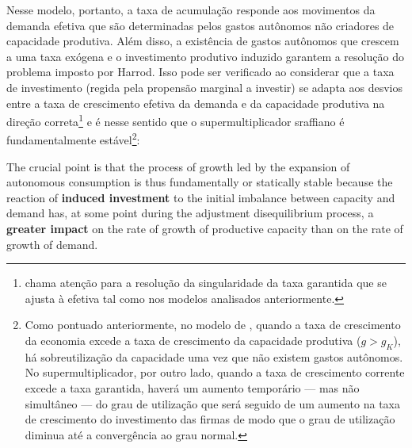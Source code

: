 Nesse modelo, portanto, a taxa de acumulação responde aos movimentos da demanda efetiva que são determinadas pelos gastos autônomos não criadores de capacidade produtiva. Além disso, a existência de gastos autônomos que crescem a uma taxa exógena e o investimento produtivo induzido garantem a resolução do problema imposto por Harrod. Isso pode ser verificado ao considerar que a taxa de investimento (regida pela propensão marginal a investir) se adapta aos desvios entre a taxa de crescimento efetiva da demanda e da capacidade produtiva na direção correta\footnote{\textcite{cesaratto_neo-kaleckian_2015} chama atenção para a resolução da singularidade da taxa garantida que se ajusta à efetiva tal como nos modelos analisados anteriormente.} e é nesse sentido que o supermultiplicador sraffiano é fundamentalmente estável\footnote{
	Como pontuado anteriormente, no modelo de \textcite{harrod_essay_1939}, quando a taxa de crescimento da economia excede a taxa de crescimento da capacidade produtiva ($g > g_K$), há sobreutilização da capacidade uma vez que não existem gastos autônomos. 
	No supermultiplicador, por outro lado, quando a taxa de crescimento corrente excede a taxa garantida, haverá 
	um aumento temporário --- mas não simultâneo --- do grau de utilização que será seguido de um aumento na taxa de crescimento do investimento das firmas de modo que o grau de utilização diminua até a convergência ao grau normal.}:

\begin{citacao}
	The crucial point is that the process of growth led by the expansion of autonomous consumption is thus fundamentally or statically stable because the reaction of \textbf{induced investment} to the initial imbalance between capacity and demand has, at some point during the adjustment disequilibrium process, a \textbf{greater impact} on the rate of growth of productive capacity than on the rate of growth of demand. \cite[p.~19, grifos adicionados]{serrano_trouble_2017}
\end{citacao}

